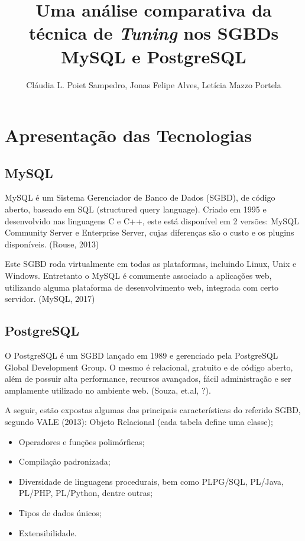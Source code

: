 \documentclass[12pt]{article}
\title{Uma análise comparativa da técnica de \textit{Tuning} nos SGBDs MySQL e PostgreSQL}
\author{Cláudia L. Poiet Sampedro\inst{1}, Jonas Felipe Alves\inst{2}, Letícia Mazzo Portela\inst{3}}
\begin{document}
 

\maketitle

  
     
  


\section{Apresentação das Tecnologias}
    \subsection{MySQL}
        MySQL é um Sistema Gerenciador de Banco de Dados (SGBD), de código aberto, baseado em SQL (structured query language). Criado em 1995 e desenvolvido nas linguagens C e C++, este está disponível em 2 versões: MySQL Community Server e Enterprise Server, cujas diferenças são o custo e os plugins disponíveis. (Rouse, 2013)
        
        Este SGBD roda virtualmente em todas as plataformas, incluindo Linux, Unix e Windows. Entretanto o MySQL é comumente associado a aplicações web, utilizando alguma plataforma de desenvolvimento web, integrada com certo servidor. (MySQL, 2017)
    \subsection{PostgreSQL}
        O PostgreSQL é um SGBD lançado em 1989 e gerenciado pela PostgreSQL Global Development Group. O mesmo é relacional, gratuito e de código aberto, além de possuir alta performance, recursos avançados, fácil administração e ser amplamente utilizado no ambiente web. (Souza, et.al, ?).
        
    	A seguir, estão expostas algumas das principais características do referido SGBD, segundo VALE (2013):
             Objeto Relacional (cada tabela define uma classe);
            \begin{itemize}
                \item Operadores e funções polimórficas;
                \item Compilação padronizada;
                \item Diversidade de linguagens procedurais, bem como PLPG/SQL, PL/Java, PL/PHP, PL/Python, dentre outras;
                \item Tipos de dados únicos;
                \item Extensibilidade.
            \end{itemize} 
\end{document}

